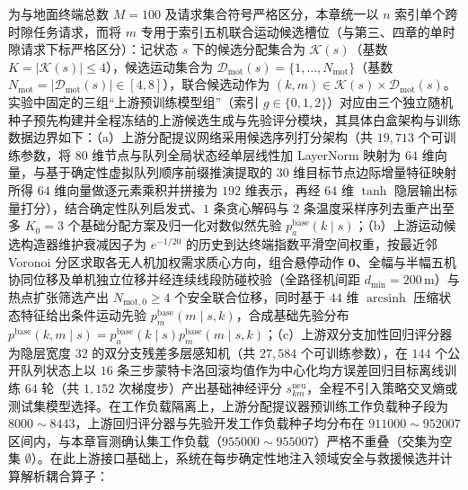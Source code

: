 为与地面终端总数 $M=100$ 及请求集合符号严格区分，本章统一以 $n$ 索引单个跨时隙任务请求，而将 $m$ 专用于索引五机联合运动候选槽位（与第三、四章的单时隙请求下标严格区分）：记状态 $s$ 下的候选分配集合为 $\mathcal{K}(s)$（基数 $K=|\mathcal{K}(s)|\leq 4$），候选运动集合为 $\mathcal{D}_{\mathrm{mot}}(s)=\{1,\ldots,N_{\mathrm{mot}}\}$（基数 $N_{\mathrm{mot}}=|\mathcal{D}_{\mathrm{mot}}(s)|\in[4,8]$），联合候选动作为 $(k,m)\in\mathcal{K}(s)\times\mathcal{D}_{\mathrm{mot}}(s)$。实验中固定的三组“上游预训练模型组”（索引 $g\in\{0,1,2\}$）对应由三个独立随机种子预先构建并全程冻结的上游候选生成与先验评分模块，其具体白盒架构与训练数据边界如下：（a）上游分配提议网络采用候选序列打分架构（共 $19{,}713$ 个可训练参数，将 $80$ 维节点与队列全局状态经单层线性加 LayerNorm 映射为 $64$ 维向量，与基于确定性虚拟队列顺序前缀推演提取的 $30$ 维目标节点边际增量特征映射所得 $64$ 维向量做逐元素乘积并拼接为 $192$ 维表示，再经 $64$ 维 $\tanh$ 隐层输出标量打分），结合确定性队列启发式、$1$ 条贪心解码与 $2$ 条温度采样序列去重产出至多 $K_0=3$ 个基础分配方案及归一化对数似然先验 $p_a^{\mathrm{base}}(k\mid s)$；（b）上游运动候选构造器维护衰减因子为 $e^{-1/20}$ 的历史到达终端指数平滑空间权重，按最近邻 Voronoi 分区求取各无人机加权需求质心方向，组合悬停动作 $\mathbf{0}$、全幅与半幅五机协同位移及单机独立位移并经连续线段防碰校验（全路径机间距 $d_{\min}=200\,\mathrm{m}$）与热点扩张筛选产出 $N_{\mathrm{mot},0}\geq 4$ 个安全联合位移，同时基于 $44$ 维 $\operatorname{arcsinh}$ 压缩状态特征给出条件运动先验 $p_m^{\mathrm{base}}(m\mid s,k)$，合成基础先验分布 $p^{\mathrm{base}}(k,m\mid s)=p_a^{\mathrm{base}}(k\mid s)p_m^{\mathrm{base}}(m\mid s,k)$；（c）上游双分支加性回归评分器为隐层宽度 $32$ 的双分支残差多层感知机（共 $27{,}584$ 个可训练参数），在 $144$ 个公开队列状态上以 $16$ 条三步蒙特卡洛回滚均值作为中心化均方误差回归目标离线训练 $64$ 轮（共 $1{,}152$ 次梯度步）产出基础神经评分 $s_{km}^{\mathrm{neu}}$，全程不引入策略交叉熵或测试集模型选择。在工作负载隔离上，上游分配提议器预训练工作负载种子段为 $8000\sim8443$，上游回归评分器与先验开发工作负载种子均分布在 $911000\sim952007$ 区间内，与本章盲测确认集工作负载（$955000\sim955007$）严格不重叠（交集为空集 $\emptyset$）。在此上游接口基础上，系统在每步确定性地注入领域安全与救援候选并计算解析耦合算子：
